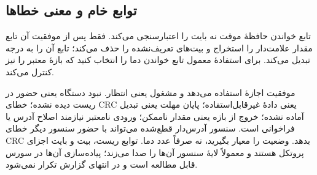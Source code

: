 \subsection{توابع خام و معنی خطاها}
تابع خواندن حافظهٔ موقت نه بایت را اعتبارسنجی می‌کند. فقط پس از موفقیت آن تابع
مقدار علامت‌دار را استخراج و بیت‌های تعریف‌نشده را حذف می‌کند؛ تابع
آن را به درجه تبدیل می‌کند. برای استفادهٔ معمول تابع خواندن دما را انتخاب
کنید که بازهٔ معتبر را نیز کنترل می‌کند.

موفقیت اجازهٔ استفاده می‌دهد و مشغول یعنی انتظار. نبود دستگاه یعنی حضور در
ریست دیده نشده؛ خطای CRC یعنی دادهٔ غیرقابل‌استفاده؛ پایان مهلت یعنی تبدیل
آماده نشده؛ خروج از بازه یعنی مقدار ناممکن؛ ورودی نامعتبر نیازمند اصلاح آدرس یا
فراخوانی است. سنسور آدرس‌دار قطع‌شده می‌تواند با حضور سنسور دیگر خطای CRC بدهد.
وضعیت را معیار بگیرید، نه صرفاً عدد دما. توابع ریست، بیت و بایت اجزای پروتکل
هستند و معمولاً لایهٔ سنسور آن‌ها را صدا می‌زند؛ پیاده‌سازی آن‌ها در سورس قابل
مطالعه است و در انتهای گزارش تکرار نمی‌شود.
